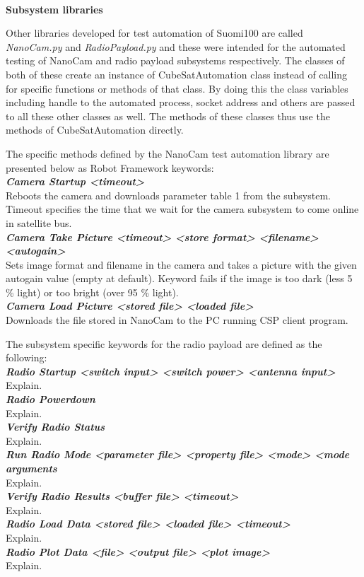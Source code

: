 \documentclass[english,12pt,a4paper,pdftex,elec,utf8]{aaltothesis}
\begin{document}
\\
\textbf{Subsystem libraries}\par 
Other libraries developed for test automation of Suomi100 are called \textit{NanoCam.py} and \textit{RadioPayload.py} and these were intended for the automated testing of NanoCam and radio payload subsystems respectively. The classes of both of these create an instance of CubeSatAutomation class instead of calling for specific functions or methods of that class. By doing this the class variables including handle to the automated process, socket address and others are passed to all these other classes as well. The methods of these classes thus use the methods of CubeSatAutomation directly.\par
The specific methods defined by the NanoCam test automation library are presented below as Robot Framework keywords:\\
\textit{\textbf{Camera Startup	<timeout>}}\\
Reboots the camera and downloads parameter table 1 from the subsystem. Timeout specifies the time that we wait for the camera subsystem to come online in satellite bus.\\
\textit{\textbf{Camera Take Picture	<timeout> <store format> <filename> <autogain>}}\\
Sets image format and filename in the camera and takes a picture with the given autogain value (empty at default). Keyword fails if the image is too dark (less 5 \% light) or too bright (over 95 \% light).\\
\textit{\textbf{Camera Load Picture	<stored file> <loaded file>}}\\
Downloads the file stored in NanoCam to the PC running CSP client program.\\
\par
The subsystem specific keywords for the radio payload are defined as the following:\\
\textit{\textbf{Radio Startup  <switch input> <switch power> <antenna input>}}\\
Explain.\\
\textit{\textbf{Radio Powerdown}}\\
Explain.\\
\textit{\textbf{Verify Radio Status}}\\
Explain.\\
\textit{\textbf{Run Radio Mode  <parameter file> <property file> <mode> <mode arguments}}\\
Explain.\\
\textit{\textbf{Verify Radio Results  <buffer file> <timeout>}}\\
Explain.\\
\textit{\textbf{Radio Load Data  <stored file> <loaded file> <timeout>}}\\
Explain.\\
\textit{\textbf{Radio Plot Data  <file> <output file> <plot image>}}\\
Explain.\\
  
\end{document}
